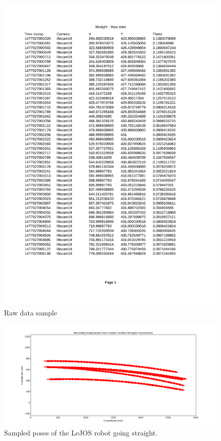 \documentclass[paper=a4, fontsize=11pt]{scrartcl} %
\begin{document}
    \begin{figure}[h!]
        \begin{center}
            \setlength{\fboxsep}{0.5pt} %
            \setlength{\fboxrule}{0.5pt}
            \includegraphics[width=12cm,fbox]{images/Raw_data}
            \caption{Raw data sample}
            \label{Raw_data}
        \end{center}
    \end{figure}

    \begin{figure}[h!]
	\begin{center}
		\setlength{\fboxsep}{0.5pt} %
		\setlength{\fboxrule}{0.5pt}
		\includegraphics[width=\linewidth,fbox]{images/raw_straight.png}
		\caption{Sampled poses of the LeJOS robot going straight.}
	\end{center}
	\end{figure}
\end{document}
